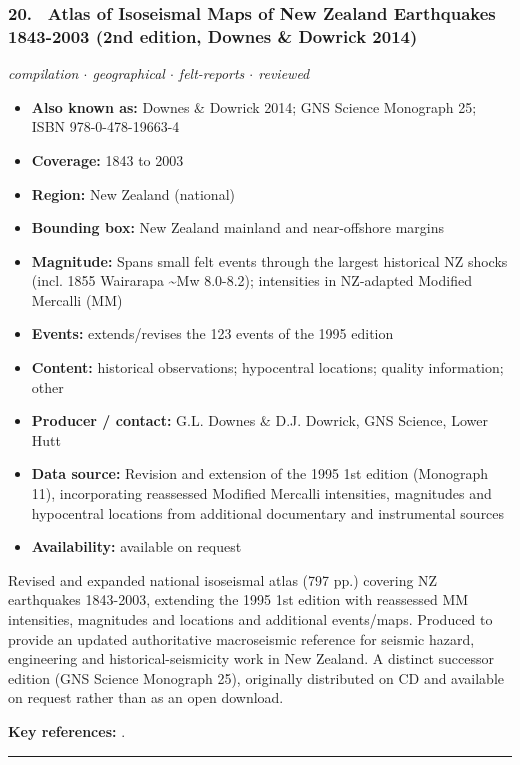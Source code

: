 \documentclass[10pt,a4paper]{article}
\newcommand{\catentryrule}{\par\vspace{3pt}\noindent\textcolor{rulegrey}{\rule{\linewidth}{0.3pt}}\par\vspace{5pt}}
\newcommand{\kv}[2]{\item \textbf{#1:} #2}
\begin{document}
\subsubsection*{\hypertarget{c:20}{20.}~ Atlas of Isoseismal Maps of New Zealand Earthquakes 1843-2003 (2nd edition, Downes \& Dowrick 2014)}
{\small\itshape compilation $\cdot$ geographical $\cdot$ felt-reports $\cdot$ reviewed}\par\vspace{2pt}
\begin{itemize}[leftmargin=1.3em,itemsep=0.6pt,topsep=1pt,parsep=0pt]
\kv{Also known as}{Downes \& Dowrick 2014; GNS Science Monograph 25; ISBN 978-0-478-19663-4}
\kv{Coverage}{1843 to 2003}
\kv{Region}{New Zealand (national)}
\kv{Bounding box}{New Zealand mainland and near-offshore margins}
\kv{Magnitude}{Spans small felt events through the largest historical NZ shocks (incl. 1855 Wairarapa \textasciitilde{}Mw 8.0-8.2); intensities in NZ-adapted Modified Mercalli (MM)}
\kv{Events}{extends/revises the 123 events of the 1995 edition}
\kv{Content}{historical observations; hypocentral locations; quality information; other}
\kv{Producer / contact}{G.L. Downes \& D.J. Dowrick, GNS Science, Lower Hutt}
\kv{Data source}{Revision and extension of the 1995 1st edition (Monograph 11), incorporating reassessed Modified Mercalli intensities, magnitudes and hypocentral locations from additional documentary and instrumental sources}
\kv{Availability}{available on request}
\end{itemize}
\par\vspace{2pt}Revised and expanded national isoseismal atlas (797 pp.) covering NZ earthquakes 1843-2003, extending the 1995 1st edition with reassessed MM intensities, magnitudes and locations and additional events/maps. Produced to provide an updated authoritative macroseismic reference for seismic hazard, engineering and historical-seismicity work in New Zealand. A distinct successor edition (GNS Science Monograph 25), originally distributed on CD and available on request rather than as an open download.
\par\vspace{2pt}\textbf{Key references:} \cite{Downes2014}.
\catentryrule
\end{document}
